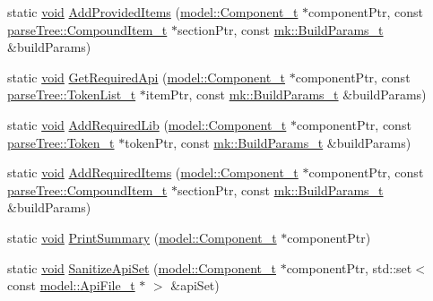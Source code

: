 \begin{DoxyCompactItemize}
\item 
static \hyperlink{_t_e_m_p_l_a_t_e__cdef_8h_ac9c84fa68bbad002983e35ce3663c686}{void} \hyperlink{namespacemodeller_a53e187286ccc1ae837888a2368557de5}{Add\+Provided\+Items} (\hyperlink{structmodel_1_1_component__t}{model\+::\+Component\+\_\+t} $\ast$component\+Ptr, const \hyperlink{structparse_tree_1_1_compound_item__t}{parse\+Tree\+::\+Compound\+Item\+\_\+t} $\ast$section\+Ptr, const \hyperlink{structmk_1_1_build_params__t}{mk\+::\+Build\+Params\+\_\+t} \&build\+Params)
\item 
static \hyperlink{_t_e_m_p_l_a_t_e__cdef_8h_ac9c84fa68bbad002983e35ce3663c686}{void} \hyperlink{namespacemodeller_ac2b5e477633284a5d8cdb18ddec4f35e}{Get\+Required\+Api} (\hyperlink{structmodel_1_1_component__t}{model\+::\+Component\+\_\+t} $\ast$component\+Ptr, const \hyperlink{structparse_tree_1_1_token_list__t}{parse\+Tree\+::\+Token\+List\+\_\+t} $\ast$item\+Ptr, const \hyperlink{structmk_1_1_build_params__t}{mk\+::\+Build\+Params\+\_\+t} \&build\+Params)
\item 
static \hyperlink{_t_e_m_p_l_a_t_e__cdef_8h_ac9c84fa68bbad002983e35ce3663c686}{void} \hyperlink{namespacemodeller_a9e17558dc6f6a7499e536655082580b0}{Add\+Required\+Lib} (\hyperlink{structmodel_1_1_component__t}{model\+::\+Component\+\_\+t} $\ast$component\+Ptr, const \hyperlink{structparse_tree_1_1_token__t}{parse\+Tree\+::\+Token\+\_\+t} $\ast$token\+Ptr, const \hyperlink{structmk_1_1_build_params__t}{mk\+::\+Build\+Params\+\_\+t} \&build\+Params)
\item 
static \hyperlink{_t_e_m_p_l_a_t_e__cdef_8h_ac9c84fa68bbad002983e35ce3663c686}{void} \hyperlink{namespacemodeller_a6d9f300b9220d069b0bbcc6536010786}{Add\+Required\+Items} (\hyperlink{structmodel_1_1_component__t}{model\+::\+Component\+\_\+t} $\ast$component\+Ptr, const \hyperlink{structparse_tree_1_1_compound_item__t}{parse\+Tree\+::\+Compound\+Item\+\_\+t} $\ast$section\+Ptr, const \hyperlink{structmk_1_1_build_params__t}{mk\+::\+Build\+Params\+\_\+t} \&build\+Params)
\item 
static \hyperlink{_t_e_m_p_l_a_t_e__cdef_8h_ac9c84fa68bbad002983e35ce3663c686}{void} \hyperlink{namespacemodeller_acde5f4331ae3c96cf392c928602e17ac}{Print\+Summary} (\hyperlink{structmodel_1_1_component__t}{model\+::\+Component\+\_\+t} $\ast$component\+Ptr)
\item 
static \hyperlink{_t_e_m_p_l_a_t_e__cdef_8h_ac9c84fa68bbad002983e35ce3663c686}{void} \hyperlink{namespacemodeller_abf15b1bd47c18699320cf6fe5d6792ef}{Sanitize\+Api\+Set} (\hyperlink{structmodel_1_1_component__t}{model\+::\+Component\+\_\+t} $\ast$component\+Ptr, std\+::set$<$ const \hyperlink{structmodel_1_1_api_file__t}{model\+::\+Api\+File\+\_\+t} $\ast$ $>$ \&api\+Set)

\end{DoxyCompactItemize}
